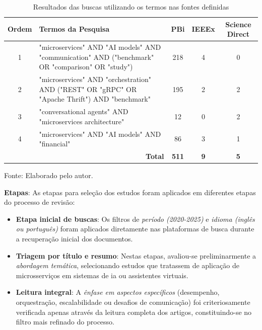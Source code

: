 \begin{table}[H]
\centering
\caption{Resultados das buscas utilizando os termos nas fontes definidas}
\begin{tabularx}{\textwidth}{|c|X|c|c|c|}
\hline
\textbf{Ordem} & \textbf{Termos da Pesquisa} & \textbf{PBi} & \textbf{IEEEx} & \textbf{Science Direct} \\
\hline
1 & "microservices" AND "AI models" AND "communication" AND ("benchmark" OR "comparison" OR "study") & 218 & 4 & 0 \\
\hline
2 & "microservices" AND "orchestration" AND ("REST" OR "gRPC" OR "Apache Thrift") AND "benchmark" & 195 & 2 & 2 \\
\hline
3 & "conversational agents" AND "microservices architecture" & 12 & 0 & 2 \\
\hline
4 & "microservices" AND "AI models" AND "financial" & 86 & 3 & 1 \\
\hline
\multicolumn{2}{|r|}{\textbf{Total}} & \textbf{511} & \textbf{9} & \textbf{5} \\
\hline
\end{tabularx}
\label{tab:3-total-rsl}
\vspace{-0.3cm}
{\raggedright \footnotesize Fonte: Elaborado pelo autor.\par}
\end{table}


\textbf{Etapas}: As etapas para seleção dos estudos foram aplicados em diferentes etapas do processo de revisão:
\begin{itemize}
\item \textbf{Etapa inicial de buscas}: Os filtros de \textit{período (2020-2025)} e \textit{idioma (inglês ou português)} foram aplicados diretamente nas plataformas de busca durante a recuperação inicial dos documentos.

\item \textbf{Triagem por título e resumo}: Nestas etapas, avaliou-se preliminarmente a \textit{abordagem temática}, selecionando estudos que tratassem de aplicação de microsserviços em sistemas de \gls{ia} ou assistentes virtuais.

\item \textbf{Leitura integral}: A \textit{ênfase em aspectos específicos} (desempenho, orquestração, escalabilidade ou desafios de comunicação) foi criteriosamente verificada apenas através da leitura completa dos artigos, constituindo-se no filtro mais refinado do processo.
\end{itemize}

